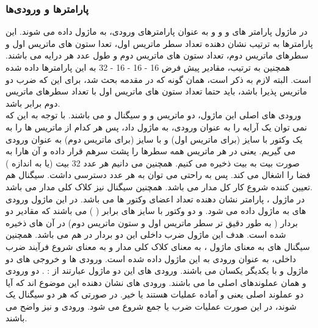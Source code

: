 \documentclass[12pt,titlepage,a4page , tikz , multi,table , svgnames,xcdraw]{article}
\begin{document}
\subsubsection{پارامترها و ورودی‌ها}
	در ماژول 
 پارامتر های 
 و 
 و 
 و 
 به عنوان پارامترهای ورودی، به ماژول داده می شوند. این پارامترها به ترتیب نشان دهنده تعداد سطر ماتریس اول، تعدا ستون های ماتریس اول و سطرهای ماتریس دوم، تعداد ستون های ماتریس دوم و طول عدد هر درایه می باشند. همچنین به ترتیب، مقادیر پیش فرض 16 - 16 - 16 - 32 به این پارامترها داده شده است. البته لازم به ذکر است، همان گونه که در مقدمه بحث شد، برای این که ضرب دو ماتریس پذیرا باشد، باید حتما تعداد ستون های ماتریس اول با تعداد سطرهای ماتریس دوم برابر باشد. \\ 
	ورودی های اصلی این ماژول، دو ماتریس 
 و 
 و سیگنال 
 و 
 می باشند. با توجه به این که نمی توان یک آرایه را به عنوان ورودی، به ماژول داد، پس هر کدام از ماتریس ها را به یک وکتور با سایز 
 (برای ماتریس اول) و با سایز 
 (برای ماتریس دوم) به عنوان ورودی می گیریم. یعنی در هر ماتریس همه سطرها را پشت سرهم قرار داده و آن هارا به صورت بیت به بیت ذخیره می کنیم. همچنین می دانیم هر عدد 32 بیت (یا به اندازه 
) فضا را اشغال می کند. پس به راحتی می توان به هر عدد دسترسی داشت. سیگنال 
 هم تعیین کننده شروع کار کل مدار می باشد. همچنین سیگنال 
 نیز کلاک کلی مدار می باشد. \\
	در ماژول 
    ، پارامتر 
     نشان دهنده تعداد اعضای وکتور ها می باشد. در این ماژول ورودی های 
      به ماژول داده می شود. 
     و 
     دو وکتور با سایز های برابر (
    ) می باشند که مقادیر دو بردار ( به طور دقیق تر سطر ماتریس اول و ستون ماتریس دوم) در آن های ذخیره شده است. هدف این ماژول ضرب داخلی این دو بردار در هم می باشد. همچنین سیگنال های 
     به معنای 
     ماژول 
    ، 
     به معنای کلاک کلی مدار و 
      به معنای شروع فرآیند ضرب داخلی، به عنوان ورودی به این ماژول داده شده است.
	ورودی ها و خروجی های دو ماژول 
     و 
     با یکدیگر یکسان می باشند. ورودی های این دو ماژول عبارتند از :
    .
    دو ورودی 
     و 
     همان عملوندهای اصلی ما می باشند. ورودی های 
     نشان دهنده این موضوع اند که آیا دو عملوند اصلی یعنی 
     و 
     آماده عملیات هستند یا خیر. در صورتی که هر دو سیگنال 
     یک شوند، در این صورت عملیات ضرب یا جمع شروع می شود. ورودی 
     و 
      نیز واضح می باشند.
\end{document}
